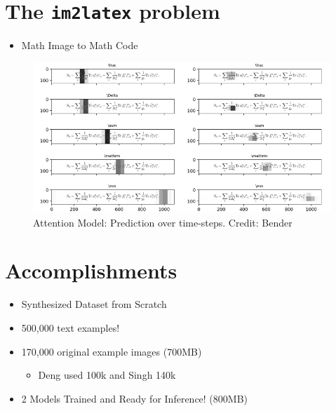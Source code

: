 \newcommand{\BLEU}{\textsc{Bleu}}

\hypertarget{the-im2latex-problem}{%
\section{\texorpdfstring{The \texttt{im2latex}
problem}{The im2latex problem}}\label{the-im2latex-problem}}

\begin{itemize}
\tightlist
\item
  Math Image to Math Code
\end{itemize}

\begin{figure}
\centering
\includegraphics{assets/attn_model.png}
\caption{Attention Model: Prediction over time-steps. Credit: Bender}
\end{figure}

\hypertarget{accomplishments}{%
\section{Accomplishments}\label{accomplishments}}

\begin{itemize}
\item
  Synthesized Dataset from Scratch
\item
  500,000 text examples!
\item
  170,000 original example images (700MB)

  \begin{itemize}
  \tightlist
  \item
    Deng used 100k and Singh 140k
  \end{itemize}
\item
  2 Models Trained and Ready for Inference! (800MB)
\end{itemize}

